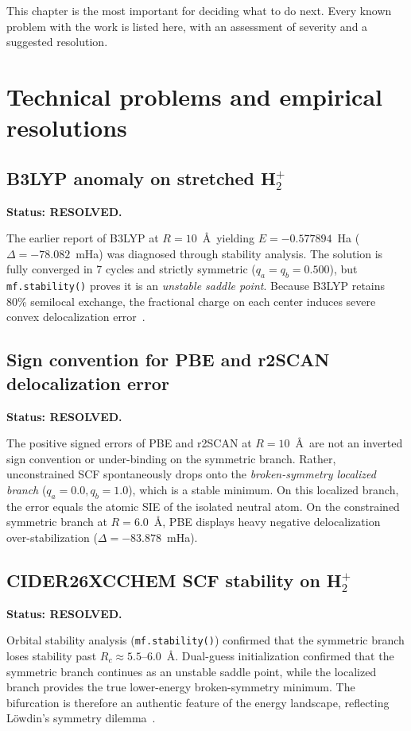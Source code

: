 \documentclass[11pt]{report}
\theoremstyle{definition}
\theoremstyle{remark}
\begin{document}
This chapter is the most important for deciding what to do next. Every
known problem with the work is listed here, with an assessment of severity
and a suggested resolution.

\section{Technical problems and empirical resolutions}

\subsection{B3LYP anomaly on stretched H$_2^+$}
\label{sec:b3lyp-problem}

\textbf{Status: RESOLVED.}

The earlier report of B3LYP at $R = 10$~\AA\ yielding $E = -0.577894$~Ha ($\Delta = -78.082$~mHa)
was diagnosed through stability analysis. The solution is fully converged in 7 cycles
and strictly symmetric ($q_a = q_b = 0.500$), but \texttt{mf.stability()} proves it is an
\emph{unstable saddle point}. Because B3LYP retains 80\% semilocal exchange, the fractional
charge on each center induces severe convex delocalization error~\cite{CMSY2008,CMSY2012}.

\subsection{Sign convention for PBE and r2SCAN delocalization error}

\textbf{Status: RESOLVED.}

The positive signed errors of PBE and r2SCAN at $R = 10$~\AA\ are not an inverted sign convention
or under-binding on the symmetric branch. Rather, unconstrained SCF spontaneously drops onto the
\emph{broken-symmetry localized branch} ($q_a = 0.0, q_b = 1.0$), which is a stable minimum.
On this localized branch, the error equals the atomic SIE of the isolated neutral atom.
On the constrained symmetric branch at $R = 6.0$~\AA, PBE displays heavy negative delocalization
over-stabilization ($\Delta = -83.878$~mHa).

\subsection{CIDER26XCCHEM SCF stability on H$_2^+$}

\textbf{Status: RESOLVED.}

Orbital stability analysis (\texttt{mf.stability()}) confirmed that the symmetric branch
loses stability past $R_c \approx 5.5\text{--}6.0$~\AA. Dual-guess initialization confirmed that
the symmetric branch continues as an unstable saddle point, while the localized branch
provides the true lower-energy broken-symmetry minimum. The bifurcation is therefore an
authentic feature of the energy landscape, reflecting L\"owdin's symmetry dilemma~\cite{Lowdin1963}.
\end{document}
